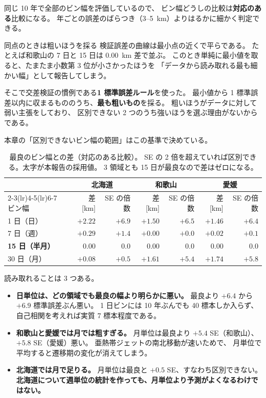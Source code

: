 同じ 10 年で全部のビン幅を評価しているので、
ビン幅どうしの比較は\textbf{対応のある}比較になる。
年ごとの誤差のばらつき（\SI{3}{}--\SI{5}{\kilo\metre}）よりはるかに細かく判定できる。

\begin{whybox}{同点のときは粗いほうを採る}
検証誤差の曲線は最小点の近くで平らである。
たとえば和歌山の \num{7} 日と \num{15} 日は \SI{0.00}{\kilo\metre} 差で並ぶ。
このとき単純に最小値を取ると、たまたま小数第 3 位が小さかったほうを
「データから読み取れる最も細かい幅」として報告してしまう。

そこで交差検証の慣例である\textbf{1 標準誤差ルール}を使った。
最小値から 1 標準誤差以内に収まるもののうち、\textbf{最も粗いもの}を採る。
粗いほうがデータに対して弱い主張をしており、
区別できない 2 つのうち強いほうを選ぶ理由がないからである。

本章の「区別できないビン幅の範囲」はこの基準で決めている。
\end{whybox}

\begin{table}[H]
\centering
\caption{最良のビン幅との差（対応のある比較）。
SE の 2 倍を超えていれば区別できる。太字が本報告の採用値。
3 領域とも 15 日が最良なので差はゼロになる。}
\begin{tabular}{lrrrrrr}
\toprule
 & \multicolumn{2}{c}{北海道} & \multicolumn{2}{c}{和歌山} & \multicolumn{2}{c}{愛媛} \\
\cmidrule(lr){2-3}\cmidrule(lr){4-5}\cmidrule(lr){6-7}
ビン幅 & 差 [\si{\kilo\metre}] & SE の倍数 & 差 [\si{\kilo\metre}] & SE の倍数 & 差 [\si{\kilo\metre}] & SE の倍数 \\
\midrule
1 日（日）  & $+2.22$ & $+6.9$ & $+1.50$ & $+6.5$ & $+1.46$ & $+6.4$ \\
7 日（週）  & $+0.29$ & $+1.4$ & $+0.00$ & $+0.0$ & $+0.02$ & $+0.1$ \\
\textbf{15 日（半月）} & $\mathbf{0.00}$ & $\mathbf{0.0}$ & $\mathbf{0.00}$ & $\mathbf{0.0}$ & $\mathbf{0.00}$ & $\mathbf{0.0}$ \\
30 日（月） & $+0.08$ & $+0.5$ & $+1.61$ & $+5.4$ & $+1.74$ & $+5.8$ \\
\bottomrule
\end{tabular}
\end{table}

読み取れることは 3 つある。

\begin{itemize}
  \item \textbf{日単位は、どの領域でも最良の幅より明らかに悪い。}
        最良より $+6.4$ から $+6.9$ 標準誤差ぶん悪い。
        1 日ビンには 10 年ぶんでも 40 標本しか入らず、
        自己相関を考えれば実質 7 標本程度である。
  \item \textbf{和歌山と愛媛では月では粗すぎる。} 月単位は最良より $+5.4$ SE（和歌山）、
        $+5.8$ SE（愛媛）悪い。
        亜熱帯ジェットの南北移動が速いためで、
        月単位で平均すると遷移期の変化が消えてしまう。
  \item \textbf{北海道では月で足りる。} 月単位は最良と $+0.5$ SE、すなわち区別できない。
        \textbf{北海道について週単位の統計を作っても、月単位より予測がよくなるわけではない。}
\end{itemize}

